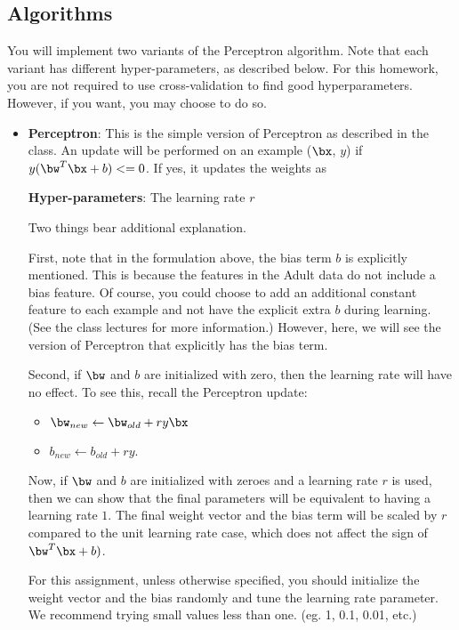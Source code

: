 \subsection{Algorithms}

You will implement two variants of the Perceptron algorithm. Note that
each variant has different hyper-parameters, as described below. For
this homework, you are not required to use cross-validation to find
good hyperparameters. However, if you want, you may choose to do so.

\begin{itemize}
\item {\bf Perceptron}: This is the simple version of Perceptron as
  described in the class. An update will be performed on an example
  ($\bx$, $y$) if $y (\bw^T\bx + b) <= 0$. If yes, it updates the weights as 
  
  {\bf Hyper-parameters}: The learning rate $r$

  Two things bear additional explanation. 

  First, note that in the formulation above, the bias term $b$ is
  explicitly mentioned. This is because the features in the Adult data
  do not include a bias feature. Of course, you could choose to add an
  additional constant feature to each example and not have the
  explicit extra $b$ during learning. (See the class lectures for more
  information.) However, here, we will see the version of Perceptron
  that explicitly has the bias term.

  Second, if $\bw$ and $b$ are initialized with zero, then the
  learning rate will have no effect. To see this, recall the
  Perceptron update: 

  \begin{itemize}
  \item[] $\bw_{new} \leftarrow \bw_{old} + r y \bx$
  \item[] $b_{new} \leftarrow b_{old} + r y$.
  \end{itemize}

  Now, if $\bw$ and $b$ are initialized with zeroes and a learning
  rate $r$ is used, then we can show that the final parameters will be
  equivalent to having a learning rate $1$. The final weight vector
  and the bias term will be scaled by $r$ compared to the unit
  learning rate case, which does not affect the sign of
  $\bw^T\bx + b)$.

  For this assignment, unless otherwise specified, you should
  initialize the weight vector and the bias randomly and tune the
  learning rate parameter. We recommend trying small values less than
  one. (eg. 1, 0.1, 0.01, etc.)


\end{itemize}
